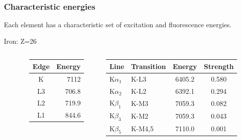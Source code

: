 \documentclass[10pt, xcolor=x11names, compress]{beamer}
\begin{document}
\begin{frame}
  \frametitle{Characteristic energies}
  
  \small%
  Each element has a characteristic set of excitation and
  fluorescence energies.

  \medskip

  \begin{block}{}
    Iron: Z=26
  \end{block}
  \begin{columns}[T]
    \begin{column}{0.1\linewidth}
      ~
    \end{column}
    \begin{column}{0.3\linewidth}
      \begin{tabular}{cr}
        Edge &  Energy \\
        \hline
        \alert{K}    & \alert{7112}    \\
        L3   & 706.8   \\
        L2   & 719.9   \\
        L1   & 844.6
      \end{tabular}
    \end{column}
    \begin{column}{0.6\linewidth}
      \begin{tabular}{llcc}
        Line & Transition & Energy &  Strength \\
        \hline
        K$\alpha_1$ & \alert{K}-L3 & 6405.2 & 0.580\\
        K$\alpha_2$ & \alert{K}-L2 & 6392.1 & 0.294\\
        K$\beta_1$  & \alert{K}-M3 & 7059.3 & 0.082\\
        K$\beta_3$  & \alert{K}-M2 & 7059.3 & 0.043\\
        K$\beta_5$  & \alert{K}-M4,5 & 7110.0 & 0.001
      \end{tabular}
    \end{column}
  \end{columns}


\end{frame}
\end{document}
